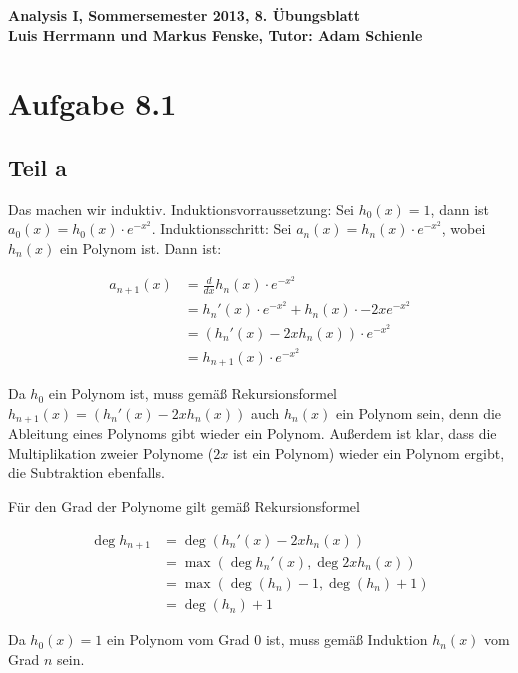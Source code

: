 \documentclass[a4paper,german,12pt,smallheadings]{scrartcl}
\begin{document}
\begin{center}
\bfseries %
\sffamily %
\vspace{-40pt}
Analysis I, Sommersemester 2013, 8. Übungsblatt \\
Luis Herrmann und Markus Fenske, Tutor: Adam Schienle
\vspace{-10pt}
\end{center}

\section*{Aufgabe 8.1}

\subsection*{Teil a}

Das machen wir induktiv. Induktionsvorraussetzung: Sei $h_0(x) = 1$,
dann ist $a_0(x) = h_0(x) \cdot e^{-x^2}$. Induktionsschritt: Sei
$a_n(x) = h_n(x) \cdot e^{-x^2}$, wobei $h_n(x)$ ein Polynom ist. Dann ist:

\begin{align*}
  a_{n+1}(x) &= \frac{d}{dx} h_n(x) \cdot e^{-x^2} \\
             &= h_n'(x) \cdot e^{-x^2} + h_n(x) \cdot -2xe^{-x^2} \\
             &= (h_n'(x) - 2x h_n(x)) \cdot e^{-x^2} \\
             &= h_{n+1}(x) \cdot e^{-x^2}
\end{align*}

Da $h_0$ ein Polynom ist, muss gemäß Rekursionsformel $h_{n+1}(x) = (h_n'(x) -
2x h_n(x))$ auch $h_n(x)$ ein Polynom sein, denn die Ableitung eines Polynoms
gibt wieder ein Polynom. Außerdem ist klar, dass die Multiplikation zweier
Polynome ($2x$ ist ein Polynom) wieder ein Polynom ergibt, die Subtraktion
ebenfalls.

Für den Grad der Polynome gilt gemäß Rekursionsformel

\begin{align*}
  \deg h_{n+1} &= \deg (h_n'(x) - 2x h_n(x)) \\
               &= \max (\deg h_n'(x), \deg 2x h_n(x)) \\
               &= \max (\deg(h_n) - 1, \deg(h_n) + 1) \\
               &= \deg(h_n) + 1
\end{align*}

Da $h_0(x) = 1$ ein Polynom vom Grad 0 ist, muss gemäß Induktion $h_n(x)$ vom Grad
$n$ sein.
\end{document}

